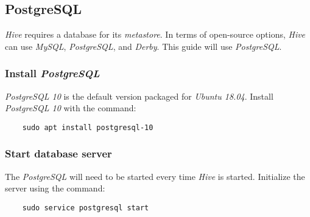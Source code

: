 \documentclass{article}
\begin{document}
  \subsection{PostgreSQL}
  \label{subsec:postgres}
  \emph{Hive} requires a database for its \emph{metastore}. In terms of open-source options, \emph{Hive} can use
  \emph{MySQL}, \emph{PostgreSQL}, and \emph{Derby}. This guide will use \emph{PostgreSQL}.

    \subsubsection{Install \emph{PostgreSQL}}
    \emph{PostgreSQL 10} is the default version packaged for \emph{Ubuntu 18.04}. Install
    \emph{PostgreSQL 10} with the command:
    \begin{verbatim}
    sudo apt install postgresql-10
    \end{verbatim}

    \subsubsection{Start database server}
    \label{subsec:pgsstart}
    The \emph{PostgreSQL} will need to be started every time \emph{Hive} is started. Initialize the
    server using the command:
    \begin{verbatim}
    sudo service postgresql start
    \end{verbatim}
\end{document}
